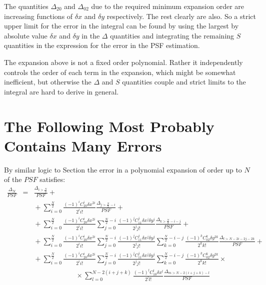 \documentclass{article}
\begin{document}
The quantities $\Delta_{20}$ and $\Delta_{02}$ due to the required minimum
expansion order are increasing functions of $\delta x$ and $\delta y$
respectively. The rest clearly are also. So a strict upper limit for the
error in the integral can be found by using the largest by absolute value
$\delta x$ and $\delta y$ in the $\Delta$ quantities and integrating the
remaining $S$ quantities in the expression for the error in the PSF
estimation.

The expansion above is not a fixed order polynomial. Rather it independently
controls the order of each term in the expansion, which might be somewhat
inefficient, but otherwise the $\Delta$ and $S$ quantities couple and strict
limits to the integral are hard to derive in general.

\section{The Following Most Probably Contains Many Errors}
By similar logic to Section \label{sec: expansion error} the error in a
polynomial expansion of order up to $N$ of the $PSF$ satisfies:
\begin{eqnarray}
	\frac{\Delta_N}{PSF} &=& \frac{\Delta_{i>\frac{N}{2}}}{PSF} + {}\nonumber\\
	&& {} + \sum_{i=0}^\frac{N}{2} \frac{(-1)^i C_{20}^i \delta x^{2i}}
	{2^i i!} \frac{\Delta_{j>\frac{N}{2}-i}}{PSF} + {}\nonumber\\
	&& {} + \sum_{i=0}^\frac{N}{2} \frac{(-1)^i C_{20}^i \delta x^{2i}}
	{2^i i!} \sum_{j=0}^{\frac{N}{2}-i} \frac{(-1)^j C_{11}^j \delta x^j
	\delta y^j}{2^j j!} \frac{\Delta_{k>\frac{N}{2}-i-j}}{PSF} + {}\nonumber\\
	&& {} + \sum_{i=0}^\frac{N}{2} \frac{(-1)^i C_{20}^i \delta x^{2i}}
	{2^i i!} \sum_{j=0}^{\frac{N}{2}-i} \frac{(-1)^j C_{11}^j \delta x^j
	\delta y^j}{2^j j!} \sum_{k=0}^{\frac{N}{2}-i-j} \frac{(-1)^k C_{02}^k
	\delta y^{2k}}{2^k k!} \frac{\Delta_{l>N-2i-2j-2k}}{PSF} + {}\nonumber\\
	&& {} + \sum_{i=0}^\frac{N}{2} \frac{(-1)^i C_{20}^i \delta x^{2i}}
	{2^i i!} \sum_{j=0}^{\frac{N}{2}-i} \frac{(-1)^j C_{11}^j \delta x^j
	\delta y^j}{2^j j!} \sum_{k=0}^{\frac{N}{2}-i-j} \frac{(-1)^k C_{02}^k
	\delta y^{2k}}{2^k k!} \times {} \nonumber\\
	&& \quad\quad\quad\quad\quad\quad
	{} \times \sum_{l=0}^{N-2(i+j+k)} \frac{(-1)^l C_{10}^l
	\delta x^l}{2^l l!} \frac{\Delta_{m>N-2(i+j+k)-l}}{PSF}
\end{eqnarray}
\end{document}
